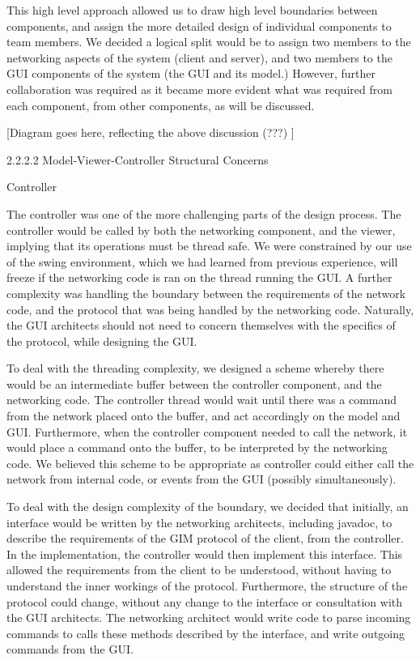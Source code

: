 This high level approach allowed us to draw high level boundaries between components, and assign the more detailed design of individual components to team members. We decided a logical split would be to assign two members to the networking aspects of the system (client and server), and two members to the GUI components of the system (the GUI and its model.) However, further collaboration was required as it became more evident what was required from each component, from other components, as will be discussed. 

[Diagram goes here, reflecting the above discussion (???) ]

2.2.2.2 Model-Viewer-Controller Structural Concerns

Controller

The controller was one of the more challenging parts of the design process. The controller would be called by both the networking component, and the viewer, implying that its operations must be thread safe. We were constrained by our use of the swing environment, which we had learned from previous experience, will freeze if the networking code is ran on the thread running the GUI. A further complexity was handling the boundary between the requirements of the network code, and the protocol that was being handled by the networking code. Naturally, the GUI architects should not need to concern themselves with the specifics of the protocol, while designing the GUI. 

To deal with the threading complexity, we designed a scheme whereby there would be an intermediate buffer between the controller component, and the networking code. The controller thread would wait until there was a command from the network placed onto the buffer, and act accordingly on the model and GUI. Furthermore, when the controller component needed to call the network, it would place a command onto the buffer, to be interpreted by the  networking code. We believed this scheme to be appropriate as controller could either call the network from internal code, or events from the GUI (possibly simultaneously).

To deal with the design complexity of the boundary, we decided that initially, an interface would be written by the networking architects, including javadoc, to describe the requirements of the GIM protocol of the client, from the controller. In the implementation, the controller would then implement this interface. This allowed the requirements from the client to be understood, without having to understand the inner workings of the protocol. Furthermore, the structure of the protocol could change, without any change to the interface or consultation with the GUI architects. The networking architect would write code to parse incoming commands to calls these methods described by the interface, and write outgoing commands from the GUI.

